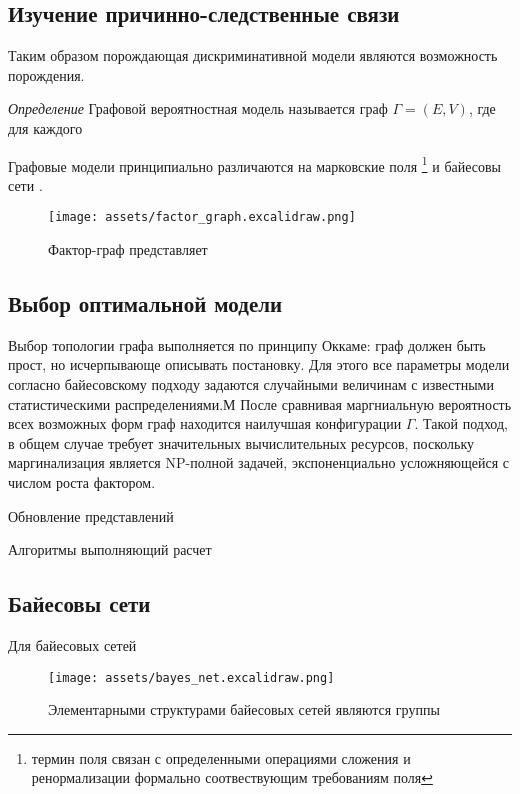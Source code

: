 \documentclass{article}
\begin{document}
\subsection{Изучение причинно-следственные связи}



Таким образом порождающая дискриминативной модели являются возможность порождения.


\textit{Определение} Графовой вероятностная модель называется граф $\Gamma = (E,V)$, где для каждого 

Графовые модели принципиально различаются на марковские поля
\footnote{термин поля связан с определенными операциями сложения и ренормализации формально соотвествующим требованиям поля}
и байесовы сети \cite{lafferty2001conditional}.


\begin{figure}[h]
    \centering
    \texttt{[image: assets/factor\_graph.excalidraw.png]}
    \caption{Фактор-граф представляет}
    \label{graph}
\end{figure}


\subsection{Выбор оптимальной модели}


Выбор топологии графа выполняется по принципу Оккаме: граф должен быть прост, но исчерпывающе описывать постановку. Для этого
все параметры модели согласно байесовскому подходу задаются случайными величинам с известными статистическими распределениями.М
После сравнивая маргниальную вероятность всех возможных форм граф находится наилучшая конфигурации $\Gamma$. Такой подход, в общем
случае требует значительных вычислительных ресурсов, поскольку маргинализация является NP-полной задачей, экспоненциально усложняющейся
с числом роста фактором.

Обновление представлений 

Алгоритмы выполняющий расчет


\subsection{Байесовы сети}

Для байесовых сетей 

\begin{figure}[h]
    \centering
    \texttt{[image: assets/bayes\_net.excalidraw.png]}
    \caption{Элементарными структурами байесовых сетей являются группы }
    \label{bayes-net}
\end{figure}
\end{document}
